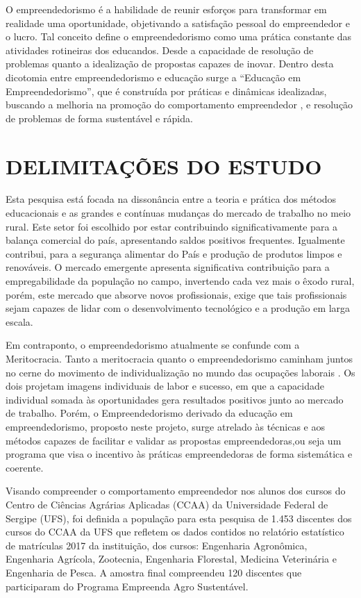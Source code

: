 O empreendedorismo é a habilidade de reunir esforços para transformar em realidade uma oportunidade, objetivando a satisfação pessoal do empreendedor e o lucro. Tal conceito define o empreendedorismo como uma prática constante das atividades rotineiras dos educandos. Desde a capacidade de resolução de problemas quanto a idealização de propostas capazes de inovar. Dentro desta dicotomia entre empreendedorismo e educação surge a “Educação em Empreendedorismo”, que é construída por práticas e dinâmicas idealizadas, buscando a melhoria na promoção do comportamento empreendedor \cite{martins_educacao_2016, morais_empreendedorismo_2018}, e resolução de problemas de forma sustentável e rápida.

\section{DELIMITAÇÕES DO ESTUDO}

Esta pesquisa está focada na dissonância entre a teoria e prática dos métodos educacionais e as grandes e contínuas mudanças do mercado de trabalho no meio rural. Este setor foi escolhido por estar contribuindo significativamente para a balança comercial do país, apresentando saldos positivos frequentes. Igualmente contribui, para a segurança alimentar do País e produção de produtos limpos e renováveis. O mercado emergente apresenta significativa contribuição para a empregabilidade da população no campo, invertendo cada vez mais o êxodo rural, porém, este mercado que absorve novos profissionais, exige que tais profissionais sejam capazes de lidar com o desenvolvimento tecnológico e a produção em larga escala. 

Em contraponto, o empreendedorismo atualmente se confunde com a Meritocracia. Tanto a meritocracia quanto o empreendedorismo caminham juntos no cerne do movimento de individualização no mundo das ocupações laborais \cite{costa_novo_2019}. Os dois projetam imagens individuais de labor e sucesso, em que a capacidade individual somada às oportunidades gera resultados positivos junto ao mercado de trabalho. Porém, o Empreendedorismo derivado da educação em empreendedorismo, proposto neste projeto, surge atrelado às técnicas e aos métodos capazes de facilitar e validar as propostas empreendedoras,ou seja um programa que visa o incentivo às práticas empreendedoras de forma sistemática e coerente.

Visando compreender o comportamento empreendedor nos alunos dos cursos do Centro de Ciências Agrárias Aplicadas (CCAA) da Universidade Federal de Sergipe (UFS), foi definida a população para esta pesquisa de 1.453 discentes dos cursos do CCAA da UFS que refletem os dados contidos no relatório estatístico de matrículas 2017 da instituição, dos cursos: Engenharia Agronômica, Engenharia Agrícola, Zootecnia, Engenharia Florestal, Medicina Veterinária e Engenharia de Pesca. A amostra final compreendeu 120 discentes que participaram do Programa Empreenda Agro Sustentável.

